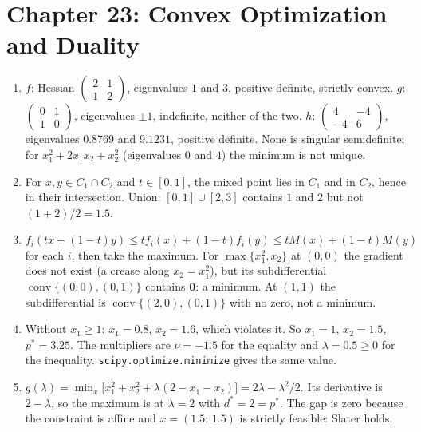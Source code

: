 \section*{Chapter 23: Convex Optimization and Duality}
\begin{enumerate}[label=\textbf{23.\arabic*}]
  \item $f$: Hessian $\begin{pmatrix}2&1\\1&2\end{pmatrix}$, eigenvalues $1$ and $3$,
        positive definite, strictly convex. $g$: $\begin{pmatrix}0&1\\1&0\end{pmatrix}$,
        eigenvalues $\pm1$, indefinite, neither of the two. $h$:
        $\begin{pmatrix}4&-4\\-4&6\end{pmatrix}$, eigenvalues $0.8769$ and $9.1231$,
        positive definite. None is singular semidefinite; for $x_{1}^{2}+2x_{1}x_{2}
        +x_{2}^{2}$ (eigenvalues $0$ and $4$) the minimum is not unique.

  \item For $x,y\in C_{1}\cap C_{2}$ and $t\in[0,1]$, the mixed point lies in
        $C_{1}$ and in $C_{2}$, hence in their intersection. Union: $[0,1]\cup[2,3]$ contains
        $1$ and $2$ but not $(1+2)/2=1.5$.

  \item $f_{i}(tx+(1-t)y)\le tf_{i}(x)+(1-t)f_{i}(y)\le tM(x)+(1-t)M(y)$ for each
        $i$, then take the maximum. For $\max\{x_{1}^{2},x_{2}\}$ at $(0,0)$ the gradient
        does not exist (a crease along $x_{2}=x_{1}^{2}$), but its subdifferential
        $\operatorname{conv}\{(0,0),(0,1)\}$ contains $\mathbf{0}$: a minimum. At $(1,1)$
        the subdifferential is $\operatorname{conv}\{(2,0),(0,1)\}$ with no zero, not a
        minimum.

  \item Without $x_{1}\ge1$: $x_{1}=0.8$, $x_{2}=1.6$, which violates it. So $x_{1}=1$,
        $x_{2}=1.5$, $p^{*}=3.25$. The multipliers are $\nu=-1.5$ for the equality and
        $\lambda=0.5\ge0$ for the inequality. \texttt{scipy.optimize.mini\-mize}
        gives the same value.

  \item $g(\lambda)=\min_{x}\bigl[x_{1}^{2}+x_{2}^{2}+\lambda(2-x_{1}-x_{2})\bigr]
        =2\lambda-\lambda^{2}/2$. Its derivative is $2-\lambda$, so the maximum is at
        $\lambda=2$ with $d^{*}=2=p^{*}$. The gap is zero because the constraint is affine
        and $x=(1.5;\,1.5)$ is strictly feasible: Slater holds.


\end{enumerate}
